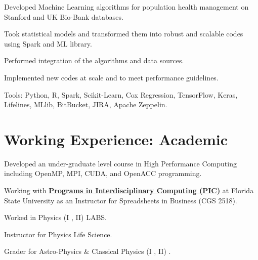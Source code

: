 \documentclass[]{template}
\begin{document}
\sectionsep
{}

\vspace{\topsep} %
\begin{tightemize}
\item Developed Machine Learning algorithms for population health management on Stanford and UK Bio-Bank databases.
\item Took statistical models and transformed them into robust and scalable codes using Spark and ML library.
\item Performed integration of the algorithms and data sources.
\item Implemented new codes at scale and to meet performance guidelines.
\item Tools: Python, R, Spark, Scikit-Learn, Cox Regression, TensorFlow, Keras, Lifelines, MLlib, BitBucket, JIRA, Apache Zeppelin.

\end{tightemize}


\sectionsep
\section{Working Experience: Academic}
\sectionsep


\vspace{\topsep}
\begin{tightemize}
\item Developed an under-graduate level course in High Performance Computing including OpenMP, MPI, CUDA, and OpenACC programming.
\item Working with \textbf{\href{https://pic.fsu.edu/}{Programs in Interdisciplinary Computing (PIC)}} at Florida State University as an Instructor for Spreadsheets in Business (CGS 2518). 
\end{tightemize}

\sectionsep


\begin{tightemize}
\item Worked in Physics (I , II) LABS.
\item Instructor for Physics Life Science.
\item Grader for Astro-Physics \& Classical Physics (I , II) .
\end{tightemize}
\end{document}
